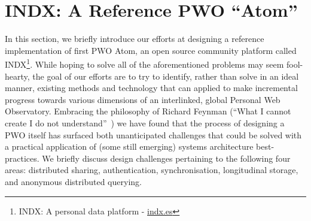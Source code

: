 \documentclass[letterpaper]{sig-alternate}
\begin{document}


\section{INDX: A Reference PWO ``Atom''}

In this section, we briefly introduce our efforts at designing a reference implementation of first PWO Atom, an open source community platform called INDX\footnote{INDX: A personal data platform - \url{indx.es}}.  While hoping to solve all of the aforementioned problems may seem fool-hearty, the goal of our efforts are to try to identify, rather than solve in an ideal manner, existing methods and technology that can applied to  make incremental progress towards various dimensions of an interlinked, global Personal Web Observatory.  Embracing the philosophy of Richard Feynman (``What I cannot create I do not understand''~\cite{feynman1982simulating}) we have found that the process of designing a PWO itself has surfaced both unanticipated challenges that could be solved with a practical application of (some still emerging) systems architecture best-practices.  We briefly discuss design challenges pertaining to the following four areas: distributed sharing, authentication, synchronisation, longitudinal storage, and anonymous distributed querying.
\end{document}
